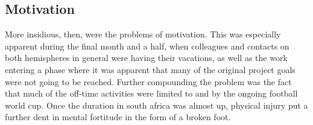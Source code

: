 \subsection{Motivation}

More insidious, then, were the problems of motivation. This was especially
apparent during the final month and a half, when colleagues and contacts on
both hemispheres in general were having their vacations, as well as the
work entering a phase where it was apparent that many of the original
project goals were not going to be reached. Further compounding the problem
was the fact that much of the off-time activities were limited to and by
the ongoing football world cup. Once the duration in south africa was
almost up, physical injury put a further dent in mental fortitude in the
form of a broken foot.

